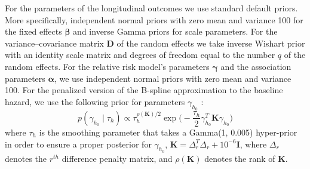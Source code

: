 For the parameters of the longitudinal outcomes we use standard default priors. More specifically, independent normal priors with zero mean and variance 100 for the fixed effects $\boldsymbol{\beta}$ and inverse Gamma priors for scale parameters. For the variance–covariance matrix $\boldsymbol{D}$ of the random effects we take inverse Wishart prior with an identity scale matrix and degrees of freedom equal to the number $q$ of the random effects. For the relative risk model's parameters $\boldsymbol{\gamma}$ and the association parameters $\boldsymbol{\alpha}$, we use independent normal priors with zero mean and variance 100. For the penalized version of the B-spline approximation to the baseline hazard, we use the following prior for parameters $\gamma_{h_0}$ \citep{lang2004bayesian}:
\begin{equation*}
p(\gamma_{h_0} \mid \tau_h) \propto \tau_h^{\rho(\boldsymbol{K})/2} \exp\Big(-\frac{\tau_h}{2}\gamma_{h_0}^T \boldsymbol{K} \gamma_{h_0}\Big)
\end{equation*}
where $\tau_h$ is the smoothing parameter that takes a Gamma(1, 0.005) hyper-prior in order to ensure a proper posterior for $\gamma_{h_0}$, $\boldsymbol{K} = \Delta_r^T \Delta_r + 10^{-6} \boldsymbol{I}$, where $\Delta_r$ denotes the $r^{th}$ difference penalty matrix, and $\rho(\boldsymbol{K})$ denotes the rank of $\boldsymbol{K}$.